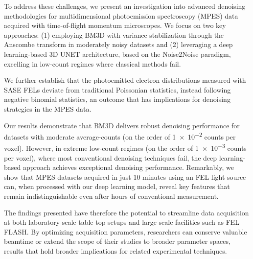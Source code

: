 To address these challenges, we present an investigation into advanced denoising methodologies for multidimensional photoemission spectroscopy (MPES) data acquired with time-of-flight momentum microscopes. We focus on two key approaches: (1) employing BM3D with variance stabilization through the Anscombe transform in moderately noisy datasets and (2) leveraging a deep learning-based 3D UNET architecture, based on the Noise2Noise paradigm, excelling in low-count regimes where classical methods fail.

We further establish that the photoemitted electron distributions measured with SASE FELs deviate from traditional Poissonian statistics, instead following negative binomial statistics, an outcome that has implications for denoising strategies in the MPES data.

Our results demonstrate that BM3D delivers robust denoising performance for datasets with moderate average-counts (on the order of \num{1e-2} counts per voxel). However, in extreme low-count regimes (on the order of \num{1e-3} counts per voxel), where most conventional denoising techniques fail, the deep learning-based approach achieves exceptional denoising performance. Remarkably, we show that MPES datasets acquired in just \num{10} minutes using an FEL light source can, when processed with our deep learning model, reveal key features that remain indistinguishable even after hours of conventional measurement.

The findings presented have therefore the potential to streamline data acquisition at both laboratory-scale table-top setups and large-scale facilities such as FEL FLASH. By optimizing acquisition parameters, researchers can conserve valuable beamtime or extend the scope of their studies to broader parameter spaces, results that hold broader implications for related experimental techniques.
